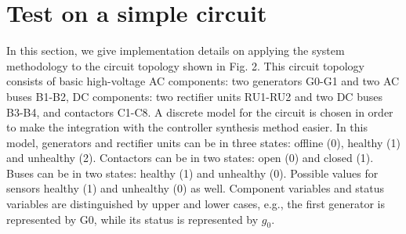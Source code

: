 \documentclass[journal]{IEEEtran}
\begin{document}
\section{Test on a simple circuit}
In this section, we give implementation details on applying the system methodology to the circuit topology shown in Fig. 2.
This circuit topology consists of basic high-voltage AC components: two generators G0-G1 and two AC buses B1-B2, DC components: two rectifier units RU1-RU2 and two DC buses B3-B4, and contactors C1-C8. A discrete model for the circuit is chosen in order to make the integration with the controller synthesis method easier. In this model, generators and rectifier units can be in three states: offline (0), healthy (1) and unhealthy (2). Contactors can be in two states: open (0) and closed (1). Buses can be in two states: healthy (1) and unhealthy (0). Possible values for sensors healthy (1) and unhealthy (0) as well. Component variables and status variables are distinguished by upper and lower cases, e.g., the first generator is represented by G0, while its status is represented by $g_{0}$. 
\end{document}
